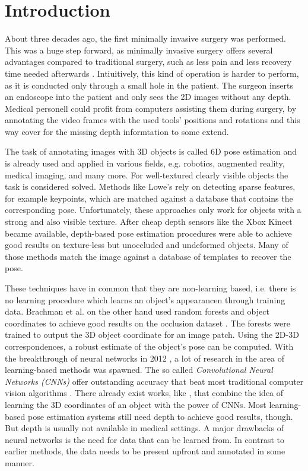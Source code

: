 \chapter{Introduction}

About three decades ago, the first minimally invasive surgery was performed. This was a huge step forward, as minimally invasive surgery offers several advantages compared to traditional surgery, such as less pain and less recovery time needed afterwards \cite{minimallyinvasive}. Intiuitively, this kind of operation is harder to perform, as it is conducted only through a small hole in the patient. The surgeon inserts an endoscope into the patient and only sees the 2D images without any depth.
Medical personell could profit from computers assisting them during surgery, by annotating the video frames with the used tools' positions and rotations and this way cover for the missing depth informtation to some extend. \

The task of annotating images with 3D objects is called 6D pose estimation and is already used and applied in various fields, e.g. robotics, augmented reality, medical imaging, and many more. For well-textured clearly visible objects the task is considered solved. Methods like Lowe's \cite{dglowe1} rely on detecting sparse features, for example keypoints, which are matched against a database that contains the corresponding pose.
Unfortunately, these approaches only work for objects with a strong and also visible texture. After cheap depth sensors like the Xbox Kinect became available, depth-based pose estimation procedures were able to achieve good results on texture-less but unoccluded and undeformed objects. Many of those methods match the image against a database of templates to recover the pose. \

These techniques have in common that they are non-learning based, i.e. there is no learning procedure which learns an object's appearancen through training data. Brachman et al. on the other hand used random forests and object coordinates to achieve good results on the occlusion dataset \cite{brachmann1}. The forests were trained to output the 3D object coordinate for an image patch. Using the 2D-3D correspondences, a robust estimate of the object's pose can be computed. With the breakthrough of neural networks in 2012 \cite{imagenet}, a lot of research in the area of learning-based methods was spawned. The so called \textit{Convolutional Neural Networks (CNNs)} offer outstanding accuracy that beat most traditional computer vision algorithms \cite{ylecun}. There already exist works, like \cite{akrull}, that combine the idea of learning the 3D coordinates of an object with the power of CNNs. Most learning-based pose estimation systems still need depth to achieve good results, though. But depth is usually not available in medical settings. A major drawbacks of neural networks is the need for data that can be learned from. In contrast to earlier methods, the data needs to be present upfront and annotated in some manner. \

